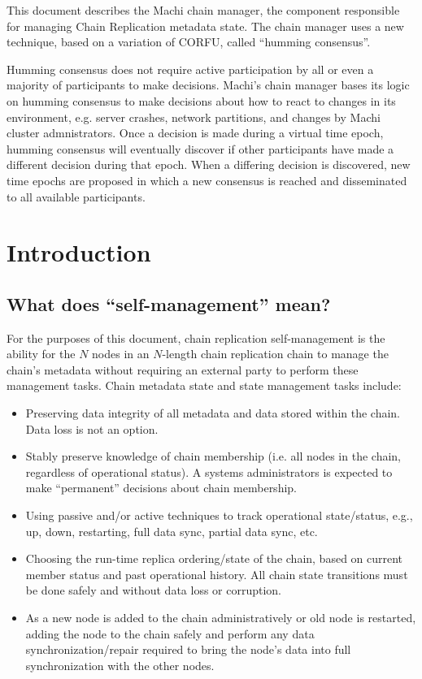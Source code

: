 \documentclass[preprint,10pt]{sigplanconf}
\begin{document}
This document describes the Machi chain manager, the component
responsible for managing Chain Replication metadata state.  The chain
manager uses a new technique, based on a variation of CORFU, called
``humming consensus''.

Humming consensus does not require active participation by all or even
a majority of participants to make decisions.  Machi's chain manager
bases its logic on humming consensus to make decisions about how to
react to changes in its environment, e.g. server crashes, network
partitions, and changes by Machi cluster admnistrators.  Once a
decision is made during a virtual time epoch, humming consensus will
eventually discover if other participants have made a different
decision during that epoch.  When a differing decision is discovered,
new time epochs are proposed in which a new consensus is reached and
disseminated to all available participants.

\section{Introduction}
\label{sec:introduction}

\subsection{What does ``self-management'' mean?}
\label{sub:self-management}

For the purposes of this document, chain replication self-management
is the ability for the $N$ nodes in an $N$-length chain replication chain
to manage the chain's metadata without requiring an external party
to perform these management tasks.  Chain metadata state and state
management tasks include:

\begin{itemize}
\item Preserving data integrity of all metadata and data stored within
  the chain.  Data loss is not an option.
\item Stably preserve knowledge of chain membership (i.e. all nodes in
   the chain, regardless of operational status). A systems
   administrators is expected to make ``permanent'' decisions about
   chain membership.
\item Using passive and/or active techniques to track operational
   state/status, e.g., up, down, restarting, full data sync, partial
   data sync, etc.
\item Choosing the run-time replica ordering/state of the chain, based on
   current member status and past operational history.  All chain
   state transitions must be done safely and without data loss or
   corruption.
\item As a new node is added to the chain administratively or old node is
   restarted, adding the node to the chain safely and perform any data
   synchronization/repair required to bring the node's data into
   full synchronization with the other nodes.
\end{itemize}
\end{document}
